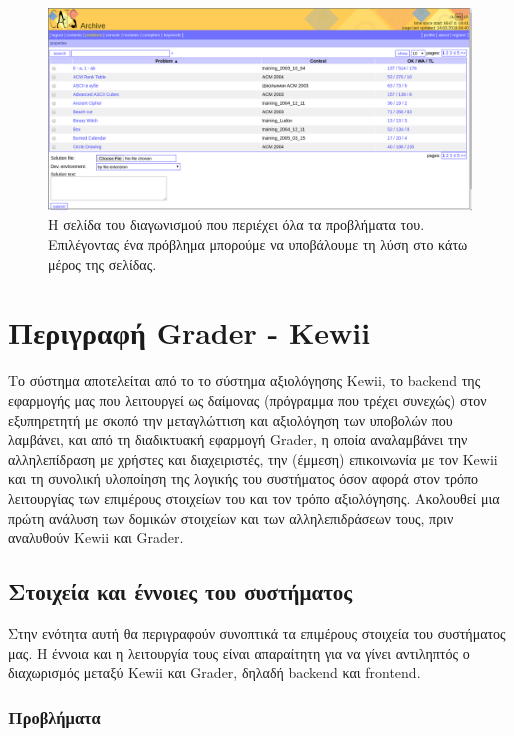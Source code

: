 \documentclass[diploma]{softlab-thesis}
\begin{document}
\begin{figure}
  \centering
  \includegraphics[scale=0.3,trim=4 4 4 4,clip]{Figures/catssubmission.png}
  \caption[Σελίδα διαγωνισμού και υποβολής CATS]{Η σελίδα του διαγωνισμού που
  περιέχει όλα τα προβλήματα του. Επιλέγοντας ένα πρόβλημα μπορούμε να υποβάλουμε
  τη λύση στο κάτω μέρος της σελίδας.}
\end{figure}


\chapter{Περιγραφή Grader - Kewii}

Το σύστημα αποτελείται από το το σύστημα αξιολόγησης Kewii, το backend της
εφαρμογής μας που λειτουργεί ως δαίμονας (πρόγραμμα που τρέχει συνεχώς) στον
εξυπηρετητή με σκοπό την μεταγλώττιση και αξιολόγηση των υποβολών που λαμβάνει,
και από τη διαδικτυακή εφαρμογή Grader, η οποία αναλαμβάνει την αλληλεπίδραση
με χρήστες και διαχειριστές, την (έμμεση) επικοινωνία με τον Kewii και τη
συνολική υλοποίηση της λογικής του συστήματος όσον αφορά στον τρόπο λειτουργίας
των επιμέρους στοιχείων του και τον τρόπο αξιολόγησης. Ακολουθεί μια πρώτη
ανάλυση των δομικών στοιχείων και των αλληλεπιδράσεων τους, πριν αναλυθούν Kewii
και Grader.

\section{Στοιχεία και έννοιες του συστήματος}

Στην ενότητα αυτή θα περιγραφούν συνοπτικά τα επιμέρους στοιχεία του συστήματος
μας. Η έννοια και η λειτουργία τους είναι απαραίτητη για να γίνει αντιληπτός ο
διαχωρισμός μεταξύ Kewii και Grader, δηλαδή backend και frontend.

\subsection{Προβλήματα}
\end{document}
